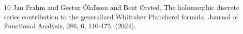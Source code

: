 \documentclass[12pt]{amsart}
\theoremstyle{definition}
\theoremstyle{remark}
\numberwithin{equation}{section}
\begin{document}
\providecommand{\MR}{\relax\ifhmode\unskip\space\fi MR }
\providecommand{\MRhref}[2]{%
\href{http://www.ams.org/mathscinet-getitem?mr=#1}{#2}
}
\providecommand{\href}[2]{#2}

\begin{thebibliography}{10}
 Jan Frahm and Gestur Ólafsson and Bent Ørsted, The holomorphic discrete series contribution to the generalized Whittaker Plancherel formula,
 Journal of Functional Analysis, 286, 6, 110-175, (2024).



\end{thebibliography}
\end{document}
